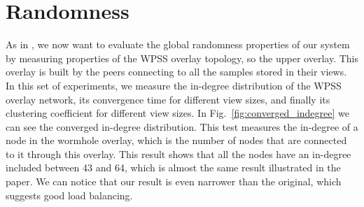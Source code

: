 \section{Randomness}
\label{sec:eval_randomness}
As in \cite{wormhole}, we now want to evaluate the global randomness properties of our system by measuring properties of the WPSS overlay topology, so the upper overlay. This overlay is built by the peers connecting to all the samples stored in their views. In this set of experiments, we measure the in-degree distribution of the WPSS overlay network, its convergence time for different view sizes, and finally its clustering coefficient for different view sizes. In Fig.~\ref{fig:converged_indegree} we can see the converged in-degree distribution. This test measures the in-degree of a node in the wormhole overlay, which is the number of nodes that are connected to it through this overlay. This result shows that all the nodes have an in-degree included between 43 and 64, which is almost the same result illustrated in the paper. We can notice that our result is even narrower than the original, which suggests good load balancing. 

